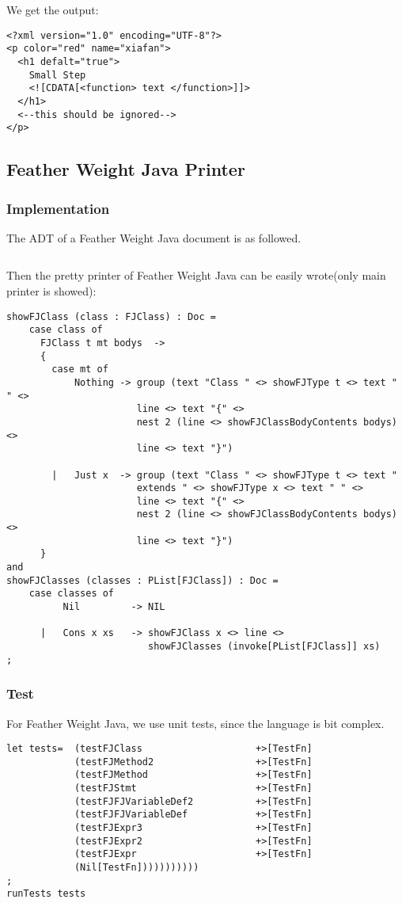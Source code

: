 We get the output:
\begin{lstlisting}
<?xml version="1.0" encoding="UTF-8"?>
<p color="red" name="xiafan">
  <h1 defalt="true">
    Small Step
    <![CDATA[<function> text </function>]]>
  </h1>
  <--this should be ignored-->
</p>
\end{lstlisting}


\subsection{Feather Weight Java Printer}

\subsubsection{Implementation}
The ADT of a Feather Weight Java document is as followed.
\begin{lstlisting}

\end{lstlisting}
Then the pretty printer of Feather Weight Java can be easily wrote(only main printer is showed):
\begin{lstlisting}
showFJClass (class : FJClass) : Doc =
    case class of
      FJClass t mt bodys  ->
      {
        case mt of
            Nothing -> group (text "Class " <> showFJType t <> text " " <>
                       line <> text "{" <>
                       nest 2 (line <> showFJClassBodyContents bodys) <>
                       line <> text "}")

        |   Just x  -> group (text "Class " <> showFJType t <> text "
                       extends " <> showFJType x <> text " " <>
                       line <> text "{" <>
                       nest 2 (line <> showFJClassBodyContents bodys) <>
                       line <> text "}")
      }
and
showFJClasses (classes : PList[FJClass]) : Doc =
    case classes of
          Nil         -> NIL

      |   Cons x xs   -> showFJClass x <> line <>
                         showFJClasses (invoke[PList[FJClass]] xs)
;
\end{lstlisting}

\subsubsection{Test}
For Feather Weight Java, we use unit tests, since the language is bit complex.
\begin{lstlisting}
let tests=  (testFJClass                    +>[TestFn]
            (testFJMethod2                  +>[TestFn]
            (testFJMethod                   +>[TestFn]
            (testFJStmt                     +>[TestFn]
            (testFJFJVariableDef2           +>[TestFn]
            (testFJFJVariableDef            +>[TestFn]
            (testFJExpr3                    +>[TestFn]
            (testFJExpr2                    +>[TestFn]
            (testFJExpr                     +>[TestFn]
            (Nil[TestFn]))))))))))
;
runTests tests
\end{lstlisting}

